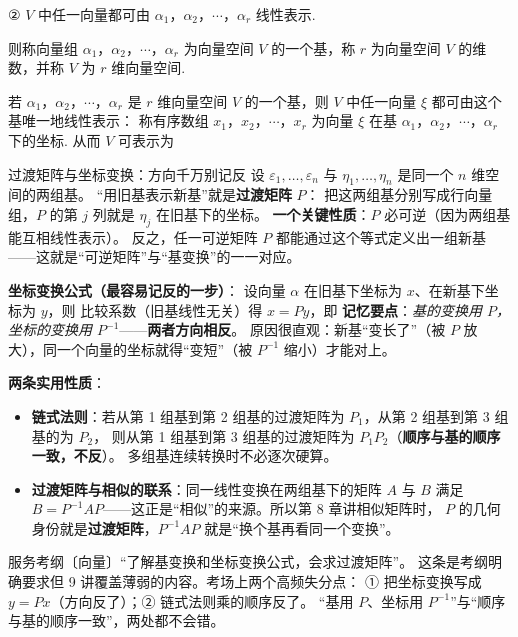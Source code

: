 ② $V$ 中任一向量都可由 $\alpha_1$，$\alpha_2$，$\cdots$，$\alpha_r$ 线性表示.

则称向量组 $\alpha_1$，$\alpha_2$，$\cdots$，$\alpha_r$ 为向量空间 $V$ 的一个基，称 $r$ 为向量空间 $V$ 的维数，并称 $V$ 为 $r$ 维向量空间.

若 $\alpha_1$，$\alpha_2$，$\cdots$，$\alpha_r$ 是 $r$ 维向量空间 $V$ 的一个基，则 $V$ 中任一向量 $\xi$ 都可由这个基唯一地线性表示：
称有序数组 $x_1$，$x_2$，$\cdots$，$x_r$ 为向量 $\xi$ 在基 $\alpha_1$，$\alpha_2$，$\cdots$，$\alpha_r$ 下的坐标. 从而 $V$ 可表示为


\begin{fdeep}{过渡矩阵与坐标变换：方向千万别记反}
设 $\varepsilon_1,\dots,\varepsilon_n$ 与 $\eta_1,\dots,\eta_n$ 是同一个 $n$ 维空间的两组基。
“用旧基表示新基”就是\textbf{过渡矩阵} $P$：
把这两组基分别写成行向量组，$P$ 的第 $j$ 列就是 $\eta_j$ 在旧基下的坐标。
\textbf{一个关键性质}：$P$ 必可逆（因为两组基能互相线性表示）。
反之，任一可逆矩阵 $P$ 都能通过这个等式定义出一组新基——这就是“可逆矩阵”与“基变换”的一一对应。

\medskip
\textbf{坐标变换公式（最容易记反的一步）}：
设向量 $\alpha$ 在旧基下坐标为 $x$、在新基下坐标为 $y$，则
比较系数（旧基线性无关）得 $x=Py$，即
\textbf{记忆要点}：\emph{基的变换用 $P$，坐标的变换用 $P^{-1}$}——\textbf{两者方向相反}。
原因很直观：新基“变长了”（被 $P$ 放大），同一个向量的坐标就得“变短”（被 $P^{-1}$ 缩小）才能对上。

\textbf{两条实用性质}：
\begin{itemize}[leftmargin=2.2em,itemsep=0.22em]
\item \textbf{链式法则}：若从第 1 组基到第 2 组基的过渡矩阵为 $P_1$，从第 2 组基到第 3 组基的为 $P_2$，
      则从第 1 组基到第 3 组基的过渡矩阵为 $P_1P_2$（\textbf{顺序与基的顺序一致，不反}）。
      多组基连续转换时不必逐次硬算。
\item \textbf{过渡矩阵与相似的联系}：同一线性变换在两组基下的矩阵 $A$ 与 $B$ 满足
      $B=P^{-1}AP$——这正是“相似”的来源。所以第 8 章讲相似矩阵时，
      $P$ 的几何身份就是\textbf{过渡矩阵}，$P^{-1}AP$ 就是“换个基再看同一个变换”。
\end{itemize}
\fbref{}服务考纲〔向量〕“了解基变换和坐标变换公式，会求过渡矩阵”。
这条是考纲明确要求但 9 讲覆盖薄弱的内容。考场上两个高频失分点：
① 把坐标变换写成 $y=Px$（方向反了）；② 链式法则乘的顺序反了。
“基用 $P$、坐标用 $P^{-1}$”与“顺序与基的顺序一致”，两处都不会错。
\end{fdeep}

